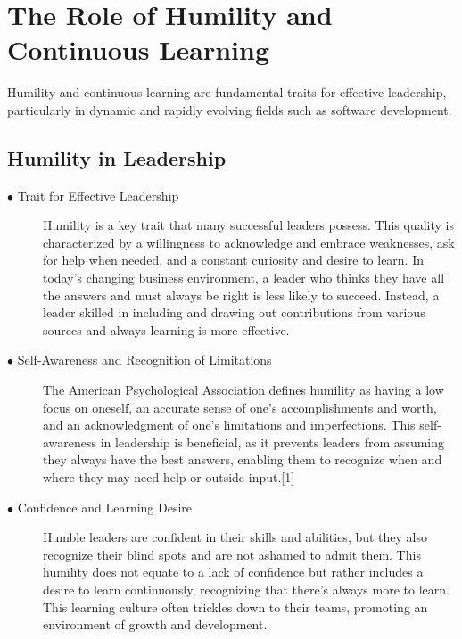 \documentclass[runningheads]{llncs}
\begin{document}
\section{The Role of Humility and Continuous Learning}

Humility and continuous learning are fundamental traits for effective leadership, particularly in dynamic and rapidly evolving fields such as software development.

\subsection{Humility in Leadership}
\begin{description}

 \item [$\bullet$ Trait for Effective Leadership] Humility is a key trait that many successful leaders possess. This quality is characterized by a willingness to acknowledge and embrace weaknesses, ask for help when needed, and a constant curiosity and desire to learn. In today's changing business environment, a leader who thinks they have all the answers and must always be right is less likely to succeed. Instead, a leader skilled in including and drawing out contributions from various sources and always learning is more effective. \cite{ref_2}\cite{ref_18} \\

 \item [$\bullet$ Self-Awareness and Recognition of Limitations] The American Psychological Association defines humility as having a low focus on oneself, an accurate sense of one's accomplishments and worth, and an acknowledgment of one's limitations and imperfections. This self-awareness in leadership is beneficial, as it prevents leaders from assuming they always have the best answers, enabling them to recognize when and where they may need help or outside input.\cite{ref_15}[1] \\

 \item [$\bullet$ Confidence and Learning Desire] Humble leaders are confident in their skills and abilities, but they also recognize their blind spots and are not ashamed to admit them. This humility does not equate to a lack of confidence but rather includes a desire to learn continuously, recognizing that there's always more to learn. This learning culture often trickles down to their teams, promoting an environment of growth and development.\cite{ref_13}\cite{ref_4}\\
\end{description}
\end{document}
